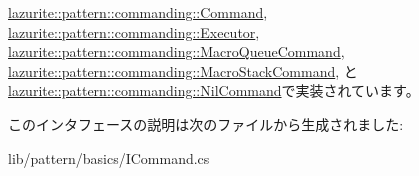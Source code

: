 \hyperlink{classlazurite_1_1pattern_1_1commanding_1_1_command_afd9750cf772a6a65b1a1e11d8313fe03}{lazurite::pattern::commanding::Command}, \hyperlink{classlazurite_1_1pattern_1_1commanding_1_1_executor_a984262e0d3834f29ac687904b16e1d34}{lazurite::pattern::commanding::Executor}, \hyperlink{classlazurite_1_1pattern_1_1commanding_1_1_macro_queue_command_a64af4fe452bfe89416ff8a4459e96d69}{lazurite::pattern::commanding::MacroQueueCommand}, \hyperlink{classlazurite_1_1pattern_1_1commanding_1_1_macro_stack_command_a9a5a088254429cfb113761f06d09fc9f}{lazurite::pattern::commanding::MacroStackCommand}, と \hyperlink{classlazurite_1_1pattern_1_1commanding_1_1_nil_command_a1e4264d6178861597779826267d5ac4c}{lazurite::pattern::commanding::NilCommand}で実装されています。

このインタフェースの説明は次のファイルから生成されました:\begin{DoxyCompactItemize}
\item 
lib/pattern/basics/ICommand.cs\end{DoxyCompactItemize}
